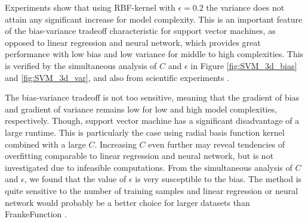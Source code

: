 \documentclass[a4paper]{article}
\begin{document}
	Experiments show that using RBF-kernel with $\epsilon=0.2$ the variance does not attain any significant increase for model complexity. This is an important feature of the bias-variance tradeoff characteristic for support vector machines, as opposed to linear regression and neural network, which provides great performance with low bias and low variance for middle to high complexities. This is verified by the simultaneous analysis of $C$ and $\epsilon$ in Figure \ref{fig:SVM_3d_bias} and \ref{fig:SVM_3d_var}, and also from scientific experiments \cite{valentini2004bias}.
	
	The bias-variance tradeoff is not too sensitive, meaning that the gradient of bias and gradient of variance remains low for low and high model complexities, respectively. Though, support vector machine has a significant disadvantage of a large runtime. This is particularly the case using radial basis function kernel combined with a large $C$. Increasing $C$ even further may reveal tendencies of overfitting comparable to linear regression and neural network, but is not investigated due to infeasible computations. From the simultaneous analysis of $C$ and $\epsilon$, we found that the value of $\epsilon$ is very susceptible to the bias. The method is quite sensitive to the number of training samples and linear regression or neural network would probably be a better choice for larger datasets than FrankeFunction \cite{valentini2004bias}.
	
	
	
	


\end{document}
